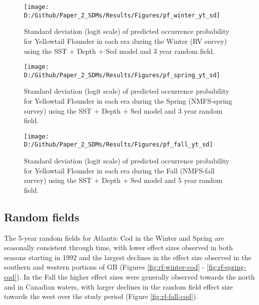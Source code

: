 \documentclass[
]{article}
\begin{document}
\begin{landscape}
\newpage
\begin{figure}[htb]

{\centering \texttt{[image: D:/Github/Paper\_2\_SDMs/Results/Figures/pf\_winter\_yt\_sd]} 

}

\caption{Standard deviation (logit scale) of predicted occurrence probability for Yellowtail Flounder in each era during the Winter (RV survey) using the SST + Depth + Sed  model and 3 year random field.}\label{fig:pf-winter-yt-sd}
\end{figure}

\newpage

\begin{figure}[htb]

{\centering \texttt{[image: D:/Github/Paper\_2\_SDMs/Results/Figures/pf\_spring\_yt\_sd]} 

}

\caption{Standard deviation (logit scale) of predicted occurrence probability for Yellowtail Flounder in each era during the Spring (NMFS-spring survey) using the  SST + Depth + Sed  model and 3 year random field.}\label{fig:pf-spring-yt-sd}
\end{figure}

\newpage
\begin{figure}[htb]

{\centering \texttt{[image: D:/Github/Paper\_2\_SDMs/Results/Figures/pf\_fall\_yt\_sd]} 

}

\caption{Standard deviation (logit scale) of predicted occurrence probability for Yellowtail Flounder in each era during the Fall (NMFS-fall survey) using the SST + Depth + Sed  model and 5 year random field.}\label{fig:pf-fall-yt-sd}
\end{figure}
\end{landscape}

\clearpage

\hypertarget{random-fields}{%
\subsection{Random fields}\label{random-fields}}

The 5-year random fields for Atlantic Cod in the Winter and Spring are seasonally consistent through time, with lower effect sizes observed in both seasons starting in 1992 and the largest declines in the effect size observed in the southern and western portions of GB (Figures \ref{fig:rf-winter-cod} - \ref{fig:rf-spring-cod}). In the Fall the higher effect sizes were generally observed towards the north and in Canadian waters, with larger declines in the random field effect size towards the west over the study period (Figure \ref{fig:rf-fall-cod}).
\end{document}
